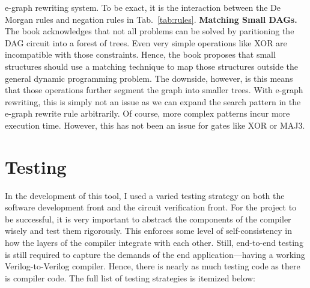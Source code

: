 \documentclass[10pt,letterpaper]{article}
\begin{document}
e-graph rewriting system. To be exact, it is the interaction between the De
Morgan rules and negation rules in Tab.~\ref{tab:rules}. \bigbreak{} \noindent
\textbf{Matching Small DAGs.} The book acknowledges that not all problems can
be solved by paritioning the DAG circuit into a forest of trees. Even very
simple operations like XOR are incompatible with those constraints. Hence, the
book proposes that small structures should use a matching technique to map
those structures outside the general dynamic programming problem. The downside,
however, is this means that those operations further segment the graph into
smaller trees. With e-graph rewriting, this is simply not an issue as we can
expand the search pattern in the e-graph rewrite rule arbitrarily. Of course,
more complex patterns incur more execution time. However, this has not been an
issue for gates like XOR or MAJ3.

\section{Testing}\label{sec:testing}

In the development of this tool, I used a varied testing strategy on both the
software development front and the circuit verification front. For the project
to be successful, it is very important to abstract the components of the
compiler wisely and test them rigorously. This enforces some level of
self-consistency in how the layers of the compiler integrate with each other.
Still, end-to-end testing is still required to capture the demands of the end
application---having a working Verilog-to-Verilog compiler. Hence, there is
nearly as much testing code as there is compiler code. The full list of testing
strategies is itemized below:
\end{document}

